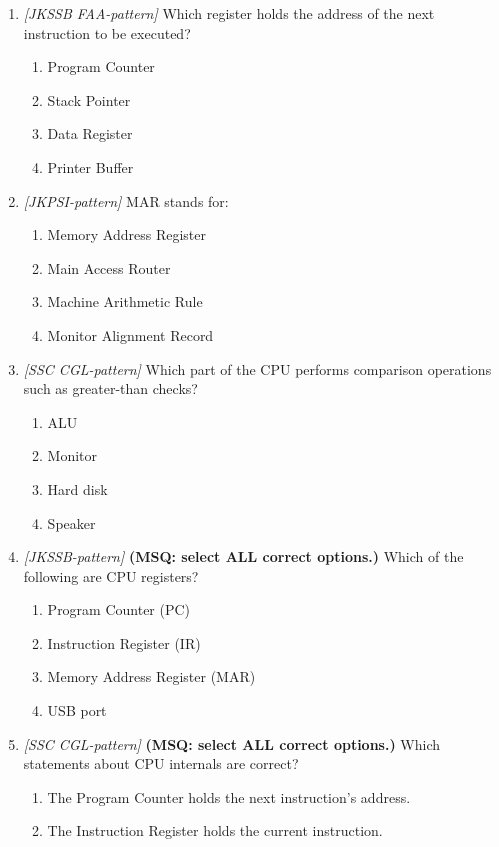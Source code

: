 \begin{enumerate}[label=\textbf{Q\arabic*.}, leftmargin=*]
\item \textit{[JKSSB FAA-pattern]} Which register holds the address of the next instruction to be executed?
  \begin{enumerate}[label=\Alph*.]
    \item Program Counter
    \item Stack Pointer
    \item Data Register
    \item Printer Buffer
  \end{enumerate}
\item \textit{[JKPSI-pattern]} MAR stands for:
  \begin{enumerate}[label=\Alph*.]
    \item Memory Address Register
    \item Main Access Router
    \item Machine Arithmetic Rule
    \item Monitor Alignment Record
  \end{enumerate}
\item \textit{[SSC CGL-pattern]} Which part of the CPU performs comparison operations such as greater-than checks?
  \begin{enumerate}[label=\Alph*.]
    \item ALU
    \item Monitor
    \item Hard disk
    \item Speaker
  \end{enumerate}
\item \textit{[JKSSB-pattern]} \textbf{(MSQ: select ALL correct options.)} Which of the following are CPU registers?
  \begin{enumerate}[label=\Alph*.]
    \item Program Counter (PC)
    \item Instruction Register (IR)
    \item Memory Address Register (MAR)
    \item USB port
  \end{enumerate}
\item \textit{[SSC CGL-pattern]} \textbf{(MSQ: select ALL correct options.)} Which statements about CPU internals are correct?
  \begin{enumerate}[label=\Alph*.]
    \item The Program Counter holds the next instruction's address.
    \item The Instruction Register holds the current instruction.

\end{enumerate}
\end{enumerate}
